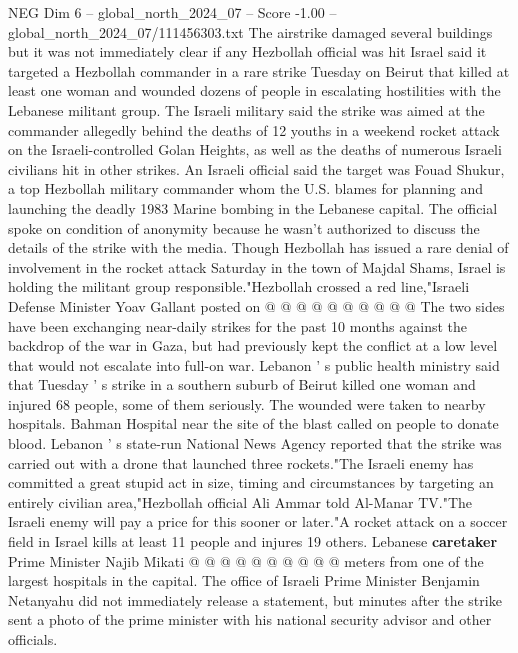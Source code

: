 \begin{textsample}{NEG Dim 6 – global\_north\_2024\_07 – Score -1.00 – global\_north\_2024\_07/111456303.txt}  \label{ex:f6_neg_141}
The airstrike damaged several buildings but it was not immediately clear if any Hezbollah official was hit Israel said it targeted a Hezbollah commander in a rare strike Tuesday on Beirut that killed at least one woman and wounded dozens of people in escalating hostilities with the Lebanese militant group.
The Israeli military said the strike was aimed at the commander allegedly behind the deaths of 12 youths in a weekend rocket attack on the Israeli-controlled Golan Heights, as well as the deaths of numerous Israeli civilians hit in other strikes.
An Israeli official said the target was Fouad Shukur, a top Hezbollah military commander whom the U.S. blames for planning and launching the deadly 1983 Marine bombing in the Lebanese capital.
The official spoke on condition of anonymity because he wasn't authorized to discuss the details of the strike with the media.
Though Hezbollah has issued a rare denial of involvement in the rocket attack Saturday in the town of Majdal Shams, Israel is holding the militant group responsible."Hezbollah crossed a red line,"Israeli Defense Minister Yoav Gallant posted on @ @ @ @ @ @ @ @ @ @ The two sides have been exchanging near-daily strikes for the past 10 months against the backdrop of the war in Gaza, but had previously kept the conflict at a low level that would not escalate into full-on war.
Lebanon ' s public health ministry said that Tuesday ' s strike in a southern suburb of Beirut killed one woman and injured 68 people, some of them seriously.
The wounded were taken to nearby hospitals.
Bahman Hospital near the site of the blast called on people to donate blood.
Lebanon ' s state-run National News Agency reported that the strike was carried out with a drone that launched three rockets."The Israeli enemy has committed a great stupid act in size, timing and circumstances by targeting an entirely civilian area,"Hezbollah official Ali Ammar told Al-Manar TV."The Israeli enemy will pay a price for this sooner or later."A rocket attack on a soccer field in Israel kills at least 11 people and injures 19 others.
Lebanese \textbf{caretaker} Prime Minister Najib Mikati @ @ @ @ @ @ @ @ @ @ meters from one of the largest hospitals in the capital.
The office of Israeli Prime Minister Benjamin Netanyahu did not immediately release a statement, but minutes after the strike sent a photo of the prime minister with his national security advisor and other officials.

\end{textsample}
